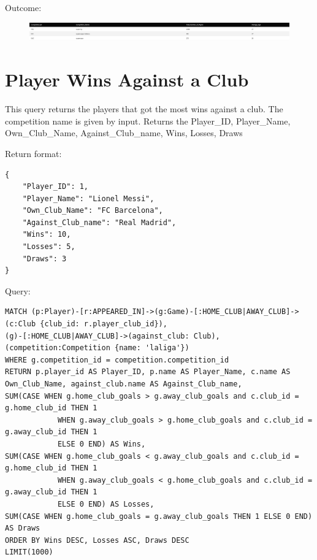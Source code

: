\documentclass{Configuration_Files/PoliMi3i_thesis}
\begin{document}
Outcome:
\begin{figure}[H]
    \centering
    \includegraphics[width=\linewidth]{Project Template/Images/query_output/q4.png}
\end{figure}











\section{Player Wins Against a Club}
This query returns the players that got the most wins against a club. The competition name is given by input.
Returns the Player\_ID, Player\_Name, Own\_Club\_Name, Against\_Club\_name, Wins, Losses, Draws

Return format:
\begin{lstlisting}[style=json]
{
    "Player_ID": 1,
    "Player_Name": "Lionel Messi",
    "Own_Club_Name": "FC Barcelona",
    "Against_Club_name": "Real Madrid",
    "Wins": 10,
    "Losses": 5,
    "Draws": 3
}
\end{lstlisting}


Query:

\begin{lstlisting}[language=Cypher]
MATCH (p:Player)-[r:APPEARED_IN]->(g:Game)-[:HOME_CLUB|AWAY_CLUB]->(c:Club {club_id: r.player_club_id}),
(g)-[:HOME_CLUB|AWAY_CLUB]->(against_club: Club),
(competition:Competition {name: 'laliga'})
WHERE g.competition_id = competition.competition_id 
RETURN p.player_id AS Player_ID, p.name AS Player_Name, c.name AS Own_Club_Name, against_club.name AS Against_Club_name,
SUM(CASE WHEN g.home_club_goals > g.away_club_goals and c.club_id = g.home_club_id THEN 1
            WHEN g.away_club_goals > g.home_club_goals and c.club_id = g.away_club_id THEN 1
            ELSE 0 END) AS Wins,
SUM(CASE WHEN g.home_club_goals < g.away_club_goals and c.club_id = g.home_club_id THEN 1
            WHEN g.away_club_goals < g.home_club_goals and c.club_id = g.away_club_id THEN 1
            ELSE 0 END) AS Losses,
SUM(CASE WHEN g.home_club_goals = g.away_club_goals THEN 1 ELSE 0 END) AS Draws
ORDER BY Wins DESC, Losses ASC, Draws DESC
LIMIT(1000)
\end{lstlisting}
\end{document}
